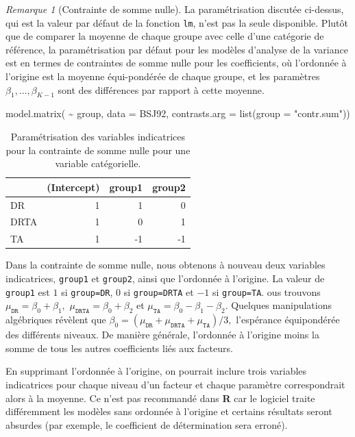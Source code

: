 \documentclass[
  11pt,
  letterpaper,
]{scrbook}
\newenvironment{Shaded}{\begin{snugshade}}{\end{snugshade}}
\newcommand{\AttributeTok}[1]{\textcolor[rgb]{0.40,0.45,0.13}{#1}}
\newcommand{\FunctionTok}[1]{\textcolor[rgb]{0.28,0.35,0.67}{#1}}
\newcommand{\NormalTok}[1]{\textcolor[rgb]{0.00,0.23,0.31}{#1}}
\newcommand{\SpecialCharTok}[1]{\textcolor[rgb]{0.37,0.37,0.37}{#1}}
\newcommand{\StringTok}[1]{\textcolor[rgb]{0.13,0.47,0.30}{#1}}
\theoremstyle{plain}
\theoremstyle{plain}
\theoremstyle{definition}
\theoremstyle{definition}
\theoremstyle{remark}
\newtheorem{refremark}{Remarque}[chapter]
\begin{document}
\begin{refremark}[Contrainte de somme nulle]
La paramétrisation discutée ci-dessus, qui est la valeur par défaut de
la fonction \texttt{lm}, n'est pas la seule disponible. Plutôt que de
comparer la moyenne de chaque groupe avec celle d'une catégorie de
référence, la paramétrisation par défaut pour les modèles d'analyse de
la variance est en termes de contraintes de somme nulle pour les
coefficients, où l'ordonnée à l'origine est la moyenne équi-pondérée de
chaque groupe, et les paramètres \(\beta_1, \ldots, \beta_{K-1}\) sont
des différences par rapport à cette moyenne.

\begin{Shaded}
\begin{Highlighting}[]
\FunctionTok{model.matrix}\NormalTok{(}
    \SpecialCharTok{\textasciitilde{}}\NormalTok{ group,}
    \AttributeTok{data =}\NormalTok{ BSJ92,}
    \AttributeTok{contrasts.arg =} \FunctionTok{list}\NormalTok{(}\AttributeTok{group =} \StringTok{"contr.sum"}\NormalTok{))}
\end{Highlighting}
\end{Shaded}

\begin{longtable}[]{@{}lrrr@{}}

\caption{\label{tbl-sum2zero}Paramétrisation des variables indicatrices
pour la contrainte de somme nulle pour une variable catégorielle.}

\tabularnewline

\toprule\noalign{}
& (Intercept) & group1 & group2 \\
\midrule\noalign{}
\endhead
\bottomrule\noalign{}
\endlastfoot
DR & 1 & 1 & 0 \\
DRTA & 1 & 0 & 1 \\
TA & 1 & -1 & -1 \\

\end{longtable}

Dans la contrainte de somme nulle, nous obtenons à nouveau deux
variables indicatrices, \texttt{group1} et \texttt{group2}, ainsi que
l'ordonnée à l'origine. La valeur de \texttt{group1} est \(1\) si
\texttt{group=DR}, \(0\) si \texttt{group=DRTA} et \(-1\) si
\texttt{group=TA}. ous trouvons
\(\mu_{\texttt{DR}} = \beta_0 + \beta_1,\)
\(\mu_{\texttt{DRTA}}=\beta_0 + \beta_2\) et
\(\mu_{\texttt{TA}} = \beta_0 - \beta_1 - \beta_2.\) Quelques
manipulations algébriques révèlent que
\(\beta_0 = (\mu_{\texttt{DR}} +\mu_{\texttt{DRTA}}+\mu_{\texttt{TA}})/3,\)
l'espérance équipondérée des différents niveaux. De manière générale,
l'ordonnée à l'origine moins la somme de tous les autres coefficients
liés aux facteurs.

En supprimant l'ordonnée à l'origine, on pourrait inclure trois
variables indicatrices pour chaque niveau d'un facteur et chaque
paramètre correspondrait alors à la moyenne. Ce n'est pas recommandé
dans \textbf{R} car le logiciel traite différemment les modèles sans
ordonnée à l'origine et certains résultats seront absurdes (par exemple,
le coefficient de détermination sera erroné).

\label{rem-sumtozero}

\end{refremark}
\end{document}
